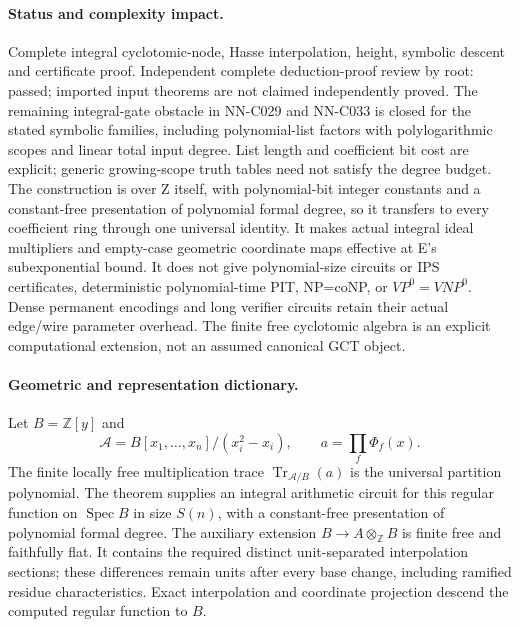 \paragraph{Status and complexity impact.}
Complete integral cyclotomic-node, Hasse interpolation, height, symbolic descent and certificate proof. Independent complete deduction-proof review by root: passed; imported input theorems are not claimed independently proved. The remaining integral-gate obstacle in NN-C029 and NN-C033 is closed for the stated symbolic families, including polynomial-list factors with polylogarithmic scopes and linear total input degree. List length and coefficient bit cost are explicit; generic growing-scope truth tables need not satisfy the degree budget. The construction is over Z itself, with polynomial-bit integer constants and a constant-free presentation of polynomial formal degree, so it transfers to every coefficient ring through one universal identity. It makes actual integral ideal multipliers and empty-case geometric coordinate maps effective at E's subexponential bound. It does not give polynomial-size circuits or IPS certificates, deterministic polynomial-time PIT, NP=coNP, or $VP^0=VNP^0$. Dense permanent encodings and long verifier circuits retain their actual edge/wire parameter overhead. The finite free cyclotomic algebra is an explicit computational extension, not an assumed canonical GCT object.

\paragraph{Geometric and representation dictionary.}
Let $B=\mathbb Z[y]$ and
\[
 \mathscr A=B[x_1,\ldots,x_n]/(x_i^2-x_i),\qquad
                       a=\prod_f\Phi_f(x).
\]
The finite locally free multiplication trace $\operatorname{Tr}_{\mathscr A/B}(a)$ is the universal partition polynomial. The theorem supplies an integral arithmetic circuit for this regular function on $\operatorname{Spec}B$ in size $S(n)$, with a constant-free presentation of polynomial formal degree. The auxiliary extension $B\to A\otimes_{\mathbb Z}B$ is finite free and faithfully flat. It contains the required distinct unit-separated interpolation sections; these differences remain units after every base change, including ramified residue characteristics. Exact interpolation and coordinate projection descend the computed regular function to $B$.

